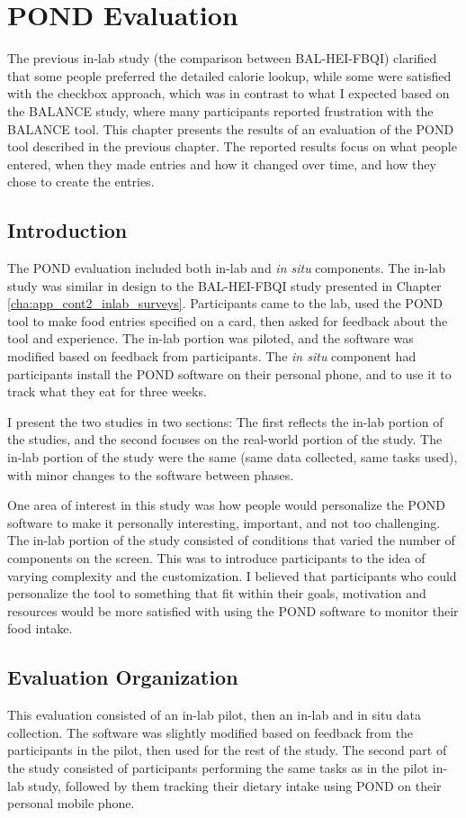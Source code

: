 
\chapter{POND Evaluation}
\label{cha:cont4}
The previous in-lab study (the comparison between BAL-HEI-FBQI) clarified that some people preferred the detailed calorie lookup, while some were satisfied with the checkbox approach, which was in contrast to what I expected based on the BALANCE study, where many participants reported frustration with the BALANCE tool. This chapter presents the results of an evaluation of the POND tool described in the previous chapter. The reported results focus on what people entered, when they made entries and how it changed over time, and how they chose to create the entries.  

\section{Introduction}
The POND evaluation included both in-lab and \textit{in situ} components.  The in-lab study was similar in design to the BAL-HEI-FBQI study presented in Chapter \ref{cha:app_cont2_inlab_surveys}. Participants came to the lab, used the POND tool to make food entries specified on a card, then asked for feedback about the tool and experience. The in-lab portion was piloted, and the software was modified based on feedback from participants. The \textit{in situ} component had participants install the POND software on their  personal phone, and to use it to track what they eat for three weeks. 

I present the two studies in two sections: The first reflects the in-lab portion of the studies, and the second focuses on the real-world portion of the study. The in-lab portion of the study were the same (same data collected, same tasks used), with minor changes to the software between phases. 

One area of interest in this study was how people would personalize the POND software to make it personally interesting, important, and not too challenging. The in-lab portion of the study consisted of conditions that varied the number of components on the screen. This was to introduce participants to the idea of varying complexity and the customization. I believed that participants who could personalize the tool to something that fit within their goals, motivation and resources would be more satisfied with using the POND software to monitor their food intake. 

\section{Evaluation Organization}
This evaluation consisted of an in-lab pilot, then an in-lab and in situ  data collection. The software was slightly modified based on feedback from the participants in the pilot, then used for the rest of the study. The second part of the study consisted of participants performing the same tasks as in the pilot in-lab study, followed by them tracking their dietary intake using POND on their personal mobile phone. 

